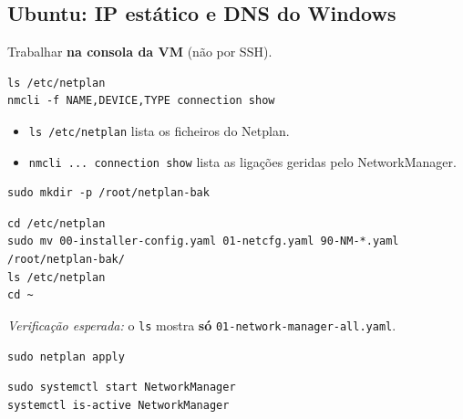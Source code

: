 
\subsection[Ubuntu: IP estático e DNS do Windows]{Ubuntu: IP estático e DNS do Windows}


Trabalhar \textbf{na consola da VM} (não por SSH).


\begin{lstlisting}[style=bashstyle]
ls /etc/netplan
nmcli -f NAME,DEVICE,TYPE connection show
\end{lstlisting}

\begin{itemize}
\item \texttt{ls /\allowbreak{}etc/\allowbreak{}netplan} lista os ficheiros do Netplan.
\item \texttt{nmcli ... connection show} lista as ligações geridas pelo NetworkManager.
\end{itemize}


\begin{lstlisting}[style=bashstyle]
sudo mkdir -p /root/netplan-bak
\end{lstlisting}


\begin{lstlisting}[style=bashstyle]
cd /etc/netplan
sudo mv 00-installer-config.yaml 01-netcfg.yaml 90-NM-*.yaml /root/netplan-bak/
ls /etc/netplan
cd ~
\end{lstlisting}

\emph{Verificação esperada:} o \texttt{ls} mostra \textbf{só} \texttt{01-network-manager-all.yaml}.


\begin{lstlisting}[style=bashstyle]
sudo netplan apply
\end{lstlisting}


\begin{lstlisting}[style=bashstyle]
sudo systemctl start NetworkManager
systemctl is-active NetworkManager
\end{lstlisting}

